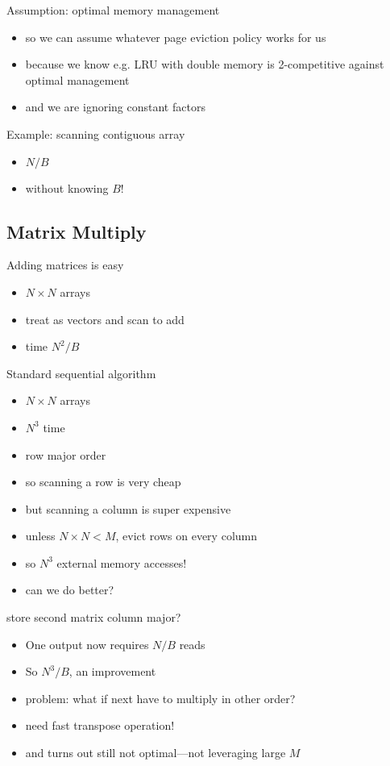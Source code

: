 \documentclass{article}
\begin{document}
Assumption: optimal memory management
\begin{itemize}
\item so we can assume whatever page eviction policy works for us
\item because we know e.g. LRU with double memory is 2-competitive
  against optimal  management 
\item and we are ignoring constant factors
\end{itemize}

Example: scanning contiguous array
\begin{itemize}
\item $N/B$
\item without knowing $B$!
\end{itemize}

\subsection*{Matrix Multiply}

Adding matrices is easy
\begin{itemize}
\item $N \times N$ arrays
\item treat as vectors and scan to add
\item time $N^2/B$
\end{itemize}

Standard sequential algorithm
\begin{itemize}
\item $N \times N$ arrays
\item $N^3$ time
\item row major order
\item so scanning a row is very cheap
\item but scanning a column is super expensive
\item unless $N \times N < M$, evict rows on every column
\item so $N^3$ external memory accesses!
\item can we do better?
\end{itemize}

store second matrix column major?
\begin{itemize}
\item One output now requires $N/B$ reads
\item So $N^3/B$, an improvement
\item problem: what if next have to multiply in other order?
\item need fast transpose operation!
\item and turns out still not optimal---not leveraging large $M$
\end{itemize}
\end{document}
